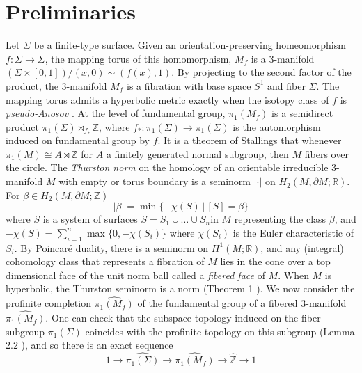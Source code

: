 \documentclass[12pt, reqno,oneside]{amsart}
\theoremstyle{definition}
\theoremstyle{plain}
\theoremstyle{TheoremNum}
\newcommand{\R}{{\mathbb R}}
\newcommand{\Z}{{\mathbb Z}}
\numberwithin{equation}{section}
\numberwithin{table}{section}
\begin{document}
    
\section{Preliminaries}\label{sec:prelim}
Let $\Sigma$ be a finite-type surface. Given an orientation-preserving homeomorphism $f:\Sigma\to \Sigma$, the mapping torus of this homomorphism, $M_f$ is a 3-manifold $(\Sigma\times [0,1])/(x,0)\sim (f(x),1)$. By projecting to the second factor of the product, the 3-manifold $M_f$ is a fibration with base space $S^1$ and fiber $\Sigma$. The mapping torus admits a hyperbolic metric exactly when the isotopy class of $f$ is {\it pseudo-Anosov} \cite{ThurstonFiber}. 
At the level of fundamental group, $\pi_1(M_f)$ is a semidirect product $\pi_1(\Sigma)\rtimes_{f_*}\Z$, where $f_*:\pi_1(\Sigma)\to \pi_1(\Sigma)$ is the automorphism induced on fundamental group by $f$. It is a theorem of Stallings \cite{StallingsFiber} that whenever $\pi_1(M)\cong A\rtimes\Z$ for $A$ a finitely generated normal subgroup, then $M$ fibers over the circle. 
\medbreak The {\it Thurston norm} \cite{Thurston1986ANF} on the homology of an orientable irreducible 3-manifold $M$ with empty or torus boundary is a seminorm $|\cdot|$ on $H_2(M,\partial M;\R)$. For $\beta\in H_2(M,\partial M;\Z)$ $$|\beta|=\min\{-\chi(S)\,|\,[S]=\beta\}$$ where $S$ is a system of surfaces $S=S_1\cup \dots\cup S_n$in $M$ representing the class $\beta$, and $-\chi(S)=\sum_{i=1}^n\max\{0,-\chi(S_i)\}$ where $\chi(S_i)$ is the Euler characteristic of $S_i$. By Poincar{\'e} duality, there is a seminorm on $H^1(M;\R)$, and any (integral) cohomology class that represents a fibration of $M$ lies in the cone over a top dimensional face of the unit norm ball called a {\it fibered face} of $M$. When $M$ is hyperbolic, the Thurston seminorm is a norm (Theorem 1 \cite{Thurston1986ANF}).
\medbreak We now consider the profinite completion $\widehat{\pi_1(M_f)}$ of the fundamental group of a fibered 3-manifold $\widehat{\pi_1(M_f)}$. One can check that the subspace topology induced on the fiber subgroup $\pi_1(\Sigma)$ coincides with the profinite topology on this subgroup (Lemma 2.2 \cite{BR}), and so there is an exact sequence
$$1\to\widehat{\pi_1(\Sigma)}\to \widehat{\pi_1(M_f)}\to\hat{\Z}\to 1$$
\end{document}

